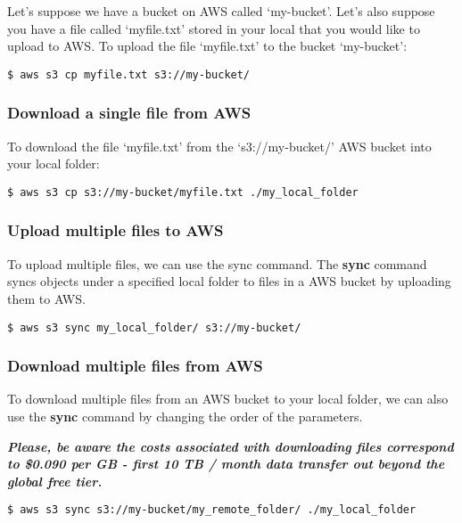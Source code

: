 \documentclass[]{book}
\begin{document}
Let's suppose we have a bucket on AWS called `my-bucket'. Let's also
suppose you have a file called `myfile.txt' stored in your local that
you would like to upload to AWS. To upload the file `myfile.txt' to the
bucket `my-bucket':

\begin{verbatim}
$ aws s3 cp myfile.txt s3://my-bucket/ 
\end{verbatim}

\subsubsection{Download a single file from
AWS}\label{download-a-single-file-from-aws}

To download the file `myfile.txt' from the `s3://my-bucket/' AWS bucket
into your local folder:

\begin{verbatim}
$ aws s3 cp s3://my-bucket/myfile.txt ./my_local_folder 
\end{verbatim}

\subsubsection{Upload multiple files to
AWS}\label{upload-multiple-files-to-aws}

To upload multiple files, we can use the sync command. The \textbf{sync}
command syncs objects under a specified local folder to files in a AWS
bucket by uploading them to AWS.

\begin{verbatim}
$ aws s3 sync my_local_folder/ s3://my-bucket/ 
\end{verbatim}

\subsubsection{Download multiple files from
AWS}\label{download-multiple-files-from-aws}

To download multiple files from an AWS bucket to your local folder, we
can also use the \textbf{sync} command by changing the order of the
parameters.

\textbf{\emph{Please, be aware the costs associated with downloading
files correspond to \$0.090 per GB - first 10 TB / month data transfer
out beyond the global free tier.}}

\begin{verbatim}
$ aws s3 sync s3://my-bucket/my_remote_folder/ ./my_local_folder 
\end{verbatim}
\end{document}
